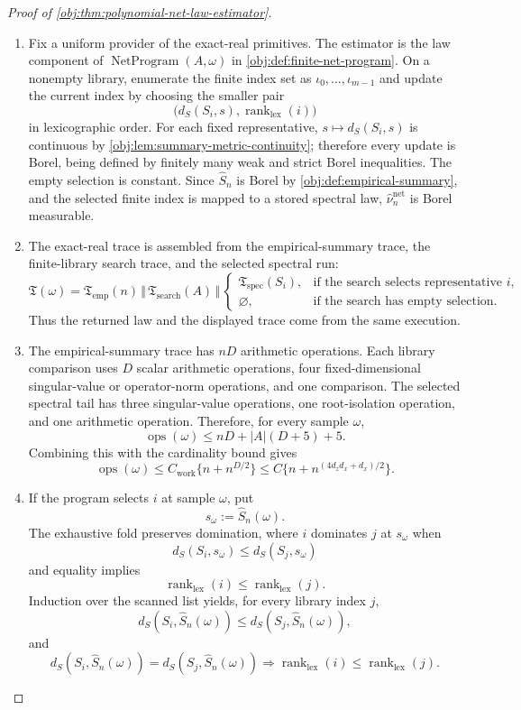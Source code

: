 \begin{proof}[Proof of \cref{obj:thm:polynomial-net-law-estimator}]
\begin{enumerate}
\item Fix a uniform provider of the exact-real primitives.  The estimator is the
law component of \(\operatorname{NetProgram}(A,\omega)\) in
\cref{obj:def:finite-net-program}.  On a nonempty library, enumerate the finite
index set as \(\iota_0,\ldots,\iota_{m-1}\) and update the current index by
choosing the smaller pair
\[
\bigl(d_S(S_i,s),\operatorname{rank}_{\mathrm{lex}}(i)\bigr)
\]
in lexicographic order.  For each fixed representative,
\(s\mapsto d_S(S_i,s)\) is continuous by
\cref{obj:lem:summary-metric-continuity}; therefore every update is Borel,
being defined by finitely many weak and strict Borel inequalities.  The empty
selection is constant.  Since \(\widehat S_n\) is Borel by
\cref{obj:def:empirical-summary}, and the selected finite index is mapped to a
stored spectral law, \(\widehat\nu_n^{\mathrm{net}}\) is Borel measurable. %

\item The exact-real trace is assembled from the empirical-summary trace, the
finite-library search trace, and the selected spectral run:
\[
\mathfrak T(\omega)
=
\mathfrak T_{\mathrm{emp}}(n)
\,\Vert\,
\mathfrak T_{\mathrm{search}}(A)
\,\Vert\,
\begin{cases}
\mathfrak T_{\mathrm{spec}}(S_i),
&\text{if the search selects representative }i,\\
\varnothing,
&\text{if the search has empty selection.}
\end{cases}
\]
Thus the returned law and the displayed trace come from the same execution. %

\item The empirical-summary trace has \(nD\) arithmetic operations.  Each
library comparison uses \(D\) scalar arithmetic operations, four
fixed-dimensional singular-value or operator-norm operations, and one
comparison.  The selected spectral tail has three singular-value operations,
one root-isolation operation, and one arithmetic operation.  Therefore, for
every sample \(\omega\),
\[
\operatorname{ops}(\omega)
\le
nD+|A|(D+5)+5 .
\]
Combining this with the cardinality bound gives
\[
\operatorname{ops}(\omega)
\le
C_{\mathrm{work}}\{n+n^{D/2}\}
\le
C\{n+n^{(4d_zd_x+d_x)/2}\}.
\] %

\item If the program selects \(i\) at sample \(\omega\), put
\[
s_\omega:=\widehat S_n(\omega).
\]
The exhaustive fold preserves domination, where \(i\) dominates \(j\) at
\(s_\omega\) when
\[
d_S(S_i,s_\omega)\le d_S(S_j,s_\omega)
\]
and equality implies
\[
\operatorname{rank}_{\mathrm{lex}}(i)
\le
\operatorname{rank}_{\mathrm{lex}}(j).
\]
Induction over the scanned list yields, for every library index \(j\),
\[
d_S(S_i,\widehat S_n(\omega))
\le d_S(S_j,\widehat S_n(\omega)),
\]
and
\[
d_S(S_i,\widehat S_n(\omega))
=
d_S(S_j,\widehat S_n(\omega))
\Longrightarrow
\operatorname{rank}_{\mathrm{lex}}(i)
\le
\operatorname{rank}_{\mathrm{lex}}(j).
\] %


\end{enumerate}
\end{proof}
